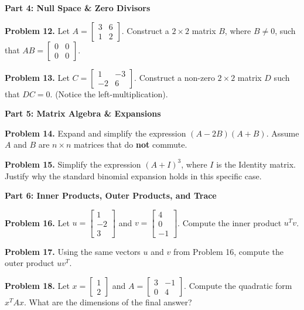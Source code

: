 \documentclass[11pt]{article}
\begin{document}
\vspace{0.5cm}
\textbf{Part 4: Null Space \& Zero Divisors}
\vspace{0.3cm}

\noindent \textbf{Problem 12.} Let $A = \begin{bmatrix} 3 & 6 \\ 1 & 2 \end{bmatrix}$. Construct a $2 \times 2$ matrix $B$, where $B \neq 0$, such that $AB = \begin{bmatrix} 0 & 0 \\ 0 & 0 \end{bmatrix}$.

\noindent \textbf{Problem 13.} Let $C = \begin{bmatrix} 1 & -3 \\ -2 & 6 \end{bmatrix}$. Construct a non-zero $2 \times 2$ matrix $D$ such that $DC = 0$. (Notice the left-multiplication).

\vspace{0.5cm}
\textbf{Part 5: Matrix Algebra \& Expansions}
\vspace{0.3cm}

\noindent \textbf{Problem 14.} Expand and simplify the expression $(A - 2B)(A + B)$. Assume $A$ and $B$ are $n \times n$ matrices that do \textbf{not} commute.

\noindent \textbf{Problem 15.} Simplify the expression $(A+I)^3$, where $I$ is the Identity matrix. Justify why the standard binomial expansion holds in this specific case.

\vspace{0.5cm}
\textbf{Part 6: Inner Products, Outer Products, and Trace}
\vspace{0.3cm}

\noindent \textbf{Problem 16.} Let $u = \begin{bmatrix} 1 \\ -2 \\ 3 \end{bmatrix}$ and $v = \begin{bmatrix} 4 \\ 0 \\ -1 \end{bmatrix}$. Compute the inner product $u^T v$.

\noindent \textbf{Problem 17.} Using the same vectors $u$ and $v$ from Problem 16, compute the outer product $uv^T$.

\noindent \textbf{Problem 18.} Let $x = \begin{bmatrix} 1 \\ 2 \end{bmatrix}$ and $A = \begin{bmatrix} 3 & -1 \\ 0 & 4 \end{bmatrix}$. Compute the quadratic form $x^T A x$. What are the dimensions of the final answer?
\end{document}
